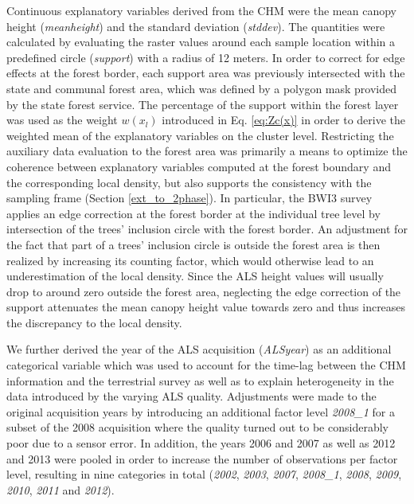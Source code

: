 Continuous explanatory variables derived from the CHM were the mean canopy height (\textit{meanheight}) and the standard deviation (\textit{stddev}). The quantities were calculated by evaluating the raster values around each sample location within a predefined circle (\textit{support}) with a radius of 12 meters. In order to correct for edge effects at the forest border, each support area was previously intersected with the state and communal forest area, which was defined by a polygon mask provided by the state forest service. The percentage of the support within the forest layer was used as the weight $w(x_l)$ introduced in Eq. \ref{eq:Zc(x)} in order to derive the weighted mean of the explanatory variables on the cluster level. Restricting the auxiliary data evaluation to the forest area was primarily a means to optimize the coherence between explanatory variables computed at the forest boundary and the corresponding local density, but also supports the consistency with the sampling frame (Section \ref{ext_to_2phase}). In particular, the BWI3 survey applies an edge correction at the forest border at the individual tree level by intersection of the trees' inclusion circle with the forest border. An adjustment for the fact that part of a trees' inclusion circle is outside the forest area is then realized by increasing its counting factor, which would otherwise lead to an underestimation of the local density. Since the ALS height values will usually drop to around zero outside the forest area, neglecting the edge correction of the support attenuates the mean canopy height value towards zero and thus increases the discrepancy to the local density.\par
We further derived the year of the ALS acquisition (\textit{ALSyear}) as an additional categorical variable which was used to account for the time-lag between the CHM information and the terrestrial survey as well as to explain heterogeneity in the data introduced by the varying ALS quality. Adjustments were made to the original acquisition years by introducing an additional factor level \textit{2008\_1} for a subset of the 2008 acquisition where the quality turned out to be considerably poor due to a sensor error. In addition, the years 2006 and 2007 as well as 2012 and 2013 were pooled in order to increase the number of observations per factor level, resulting in nine categories in total (\textit{2002}, \textit{2003}, \textit{2007}, \textit{2008\_1}, \textit{2008}, \textit{2009}, \textit{2010}, \textit{2011} and \textit{2012}).

